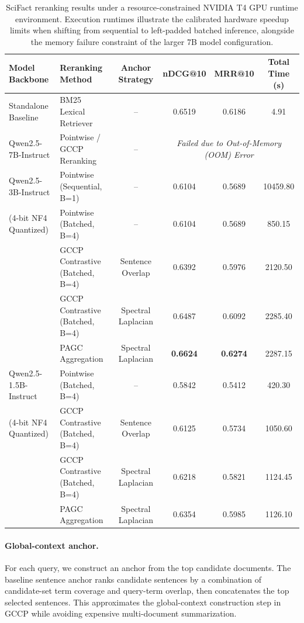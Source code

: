 \documentclass[11pt]{article}
\begin{document}
\begin{table}[t]
\centering
\small
\begin{tabular}{llcccc}
\toprule
\textbf{Model Backbone} & \textbf{Reranking Method} & \textbf{Anchor Strategy} & \textbf{nDCG@10} & \textbf{MRR@10} & \textbf{Total Time (s)} \\
\midrule
Standalone Baseline & BM25 Lexical Retriever & -- & 0.6519 & 0.6186 & 4.91 \\
\midrule
Qwen2.5-7B-Instruct & Pointwise / GCCP Reranking & -- & \multicolumn{3}{c}{\textit{Failed due to Out-of-Memory (OOM) Error}} \\
\midrule
Qwen2.5-3B-Instruct & Pointwise (Sequential, B=1) & -- & 0.6104 & 0.5689 & 10459.80 \\
(4-bit NF4 Quantized) & Pointwise (Batched, B=4) & -- & 0.6104 & 0.5689 & 850.15 \\
                       & GCCP Contrastive (Batched, B=4) & Sentence Overlap & 0.6392 & 0.5976 & 2120.50 \\
                       & GCCP Contrastive (Batched, B=4) & Spectral Laplacian & 0.6487 & 0.6092 & 2285.40 \\
                       & PAGC Aggregation & Spectral Laplacian & \textbf{0.6624} & \textbf{0.6274} & 2287.15 \\
\midrule
Qwen2.5-1.5B-Instruct & Pointwise (Batched, B=4) & -- & 0.5842 & 0.5412 & 420.30 \\
 (4-bit NF4 Quantized) & GCCP Contrastive (Batched, B=4) & Sentence Overlap & 0.6125 & 0.5734 & 1050.60 \\
                       & GCCP Contrastive (Batched, B=4) & Spectral Laplacian & 0.6218 & 0.5821 & 1124.45 \\
                       & PAGC Aggregation & Spectral Laplacian & 0.6354 & 0.5985 & 1126.10 \\
\bottomrule
\end{tabular}
\caption{SciFact reranking results under a resource-constrained NVIDIA T4 GPU runtime environment. Execution runtimes illustrate the calibrated hardware speedup limits when shifting from sequential to left-padded batched inference, alongside the memory failure constraint of the larger 7B model configuration.}
\label{tab:scifact_results}
\end{table}

\paragraph{Global-context anchor.}
For each query, we construct an anchor from the top candidate documents. The baseline sentence anchor ranks candidate sentences by a combination of candidate-set term coverage and query-term overlap, then concatenates the top selected sentences. This approximates the global-context construction step in GCCP while avoiding expensive multi-document summarization.
\end{document}

